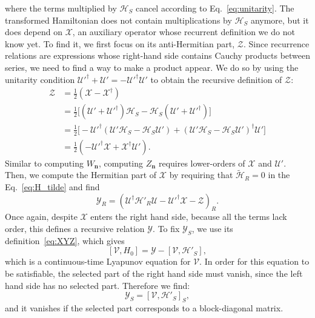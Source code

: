 %
where the terms multiplied by $\mathcal{H}_{S}$ cancel according to Eq.~\eqref{eq:unitarity}.
The transformed Hamiltonian does not contain multiplications by $\mathcal{H}_{S}$ anymore, but it does depend on $\mathcal{X}$, an auxiliary operator whose recurrent definition we do not know yet.
To find it, we first focus on its anti-Hermitian part, $\mathcal{Z}$.
Since recurrence relations are expressions whose right-hand side contains Cauchy products between series, we need to find a way to make a product appear.
We do so by using the unitarity condition $\mathcal{U}'^\dagger + \mathcal{U}' = -\mathcal{U}'^\dagger \mathcal{U}'$ to obtain the recursive definition of $\mathcal{Z}$:
%
\begin{equation}
\label{eq:Z}
\begin{aligned}
\mathcal{Z}
&= \frac{1}{2} (\mathcal{X} - \mathcal{X}^{\dagger}) \\
&= \frac{1}{2}\Big[ (\mathcal{U}' + \mathcal{U}'^{\dagger}) \mathcal{H}_{S} - \mathcal{H}_{S} (\mathcal{U}' + \mathcal{U}'^{\dagger}) \Big] \\
&= \frac{1}{2} \Big[ - \mathcal{U}'^{\dagger} (\mathcal{U}'\mathcal{H}_{S} - \mathcal{H}_{S} \mathcal{U}') + (\mathcal{U}'\mathcal{H}_{S} - \mathcal{H}_{S} \mathcal{U}')^{\dagger} \mathcal{U}' \Big] \\
&= \frac{1}{2} (-\mathcal{U}'^{\dagger} \mathcal{X} + \mathcal{X}^{\dagger} \mathcal{U}').
\end{aligned}
\end{equation}
%
Similar to computing $W_{\mathbf{n}}$, computing $Z_{\mathbf{n}}$ requires lower-orders of $\mathcal{X}$ and $\mathcal{U}'$.
Then, we compute the Hermitian part of $\mathcal{X}$ by requiring that $\tilde{\mathcal{H}}_{R} = 0$ in the Eq.~\eqref{eq:H_tilde} and find
%
\begin{equation}
\label{eq:Y_R}
\mathcal{Y}_{R} = (\mathcal{U}^\dagger \mathcal{H}'_{R} \mathcal{U} -
\mathcal{U}'^\dagger \mathcal{X} - \mathcal{Z})_{R}.
\end{equation}
%
Once again, despite $\mathcal{X}$ enters the right hand side, because all the terms lack  order, this defines a recursive relation $\mathcal{Y}$.
To fix $\mathcal{Y}_S$, we use its definition~\eqref{eq:XYZ}, which gives
\begin{equation}
  \label{eq:lyapunov}
  [\mathcal{V}, H_0] = \mathcal{Y} - [\mathcal{V}, \mathcal{H}'_{S}],
\end{equation}
which is a continuous-time Lyapunov equation for $\mathcal{V}$.
In order for this equation to be satisfiable, the selected part of the right hand side must vanish, since the left hand side has no selected part.
Therefore we find:
%
\begin{equation}
\label{eq:sylvester}
\mathcal{Y}_{S} = [\mathcal{V}, \mathcal{H}'_{S}]_{S},
\end{equation}
and it vanishes if the selected part corresponds to a block-diagonal matrix.

